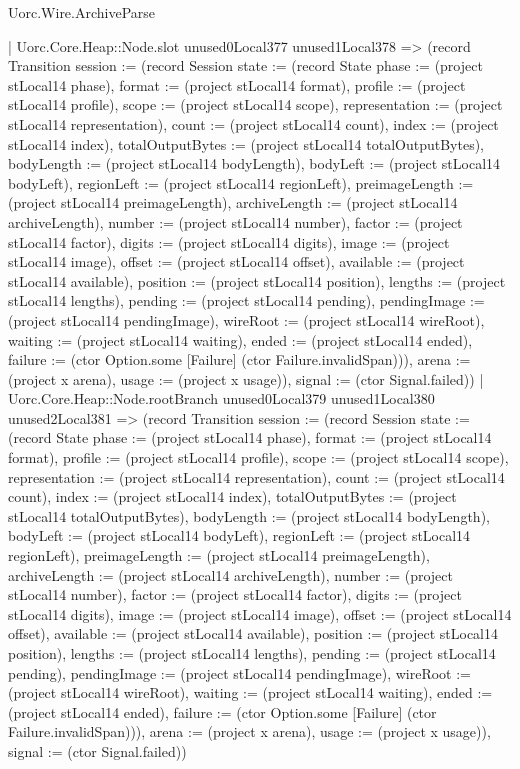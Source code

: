 \begin{lexlean}{Uorc.Wire.ArchiveParse}
\begin{semanticmodule}
{            | Uorc.Core.Heap::Node.slot unused0Local377 unused1Local378 => (record Transition {session := (record Session {state := (record State {phase := (project stLocal14 phase), format := (project stLocal14 format), profile := (project stLocal14 profile), scope := (project stLocal14 scope), representation := (project stLocal14 representation), count := (project stLocal14 count), index := (project stLocal14 index), totalOutputBytes := (project stLocal14 totalOutputBytes), bodyLength := (project stLocal14 bodyLength), bodyLeft := (project stLocal14 bodyLeft), regionLeft := (project stLocal14 regionLeft), preimageLength := (project stLocal14 preimageLength), archiveLength := (project stLocal14 archiveLength), number := (project stLocal14 number), factor := (project stLocal14 factor), digits := (project stLocal14 digits), image := (project stLocal14 image), offset := (project stLocal14 offset), available := (project stLocal14 available), position := (project stLocal14 position), lengths := (project stLocal14 lengths), pending := (project stLocal14 pending), pendingImage := (project stLocal14 pendingImage), wireRoot := (project stLocal14 wireRoot), waiting := (project stLocal14 waiting), ended := (project stLocal14 ended), failure := (ctor Option.some [Failure] (ctor Failure.invalidSpan))}), arena := (project x arena), usage := (project x usage)}), signal := (ctor Signal.failed)})
            | Uorc.Core.Heap::Node.rootBranch unused0Local379 unused1Local380 unused2Local381 => (record Transition {session := (record Session {state := (record State {phase := (project stLocal14 phase), format := (project stLocal14 format), profile := (project stLocal14 profile), scope := (project stLocal14 scope), representation := (project stLocal14 representation), count := (project stLocal14 count), index := (project stLocal14 index), totalOutputBytes := (project stLocal14 totalOutputBytes), bodyLength := (project stLocal14 bodyLength), bodyLeft := (project stLocal14 bodyLeft), regionLeft := (project stLocal14 regionLeft), preimageLength := (project stLocal14 preimageLength), archiveLength := (project stLocal14 archiveLength), number := (project stLocal14 number), factor := (project stLocal14 factor), digits := (project stLocal14 digits), image := (project stLocal14 image), offset := (project stLocal14 offset), available := (project stLocal14 available), position := (project stLocal14 position), lengths := (project stLocal14 lengths), pending := (project stLocal14 pending), pendingImage := (project stLocal14 pendingImage), wireRoot := (project stLocal14 wireRoot), waiting := (project stLocal14 waiting), ended := (project stLocal14 ended), failure := (ctor Option.some [Failure] (ctor Failure.invalidSpan))}), arena := (project x arena), usage := (project x usage)}), signal := (ctor Signal.failed)})
}
\end{semanticmodule}
\end{lexlean}
